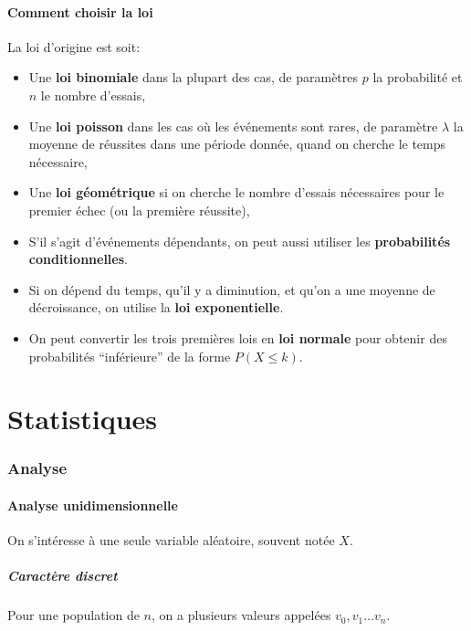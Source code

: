 \documentclass[10pt,a4paper,french]{article}
\begin{document}
\subsection{Comment choisir la loi}

La loi d'origine est soit:

\begin{itemize}
\item Une \textbf{loi binomiale} dans la plupart des cas, de paramètres $p$ la probabilité et $n$ le nombre d'essais,
\item Une \textbf{loi poisson} dans les cas où les événements sont rares, de paramètre $\lambda$ la moyenne de réussites dans une période donnée, quand on cherche le temps nécessaire,
\item Une \textbf{loi géométrique} si on cherche le nombre d'essais nécessaires pour le premier échec (ou la première réussite),
\item S'il s'agit d'événements dépendants, on peut aussi utiliser les \textbf{probabilités conditionnelles}.
\item Si on dépend du temps, qu'il y a diminution, et qu'on a une moyenne de décroissance, on utilise la \textbf{loi exponentielle}.
\item On peut convertir les trois premières lois en \textbf{loi normale} pour obtenir des probabilités ``inférieure'' de la forme $P(X \leq k)$.
\end{itemize}

\part{Statistiques}

\section{Analyse}

\subsection{Analyse unidimensionnelle}

On s'intéresse à une seule variable aléatoire, souvent notée $X$.

\subsubsection{Caractère discret}

Pour une population de $n$, on a plusieurs valeurs appelées $v_0, v_1 \ldots v_n$.
\end{document}
